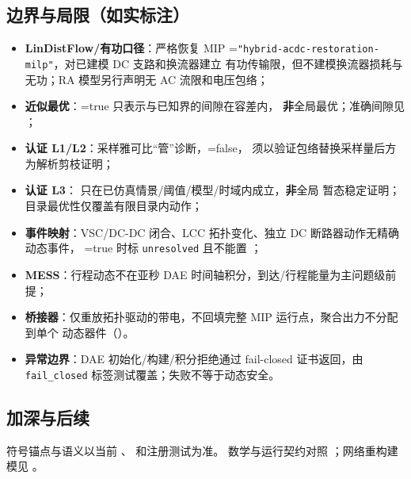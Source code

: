 \subsection{边界与局限（如实标注）}
\begin{itemize}
  \item \textbf{LinDistFlow/有功口径}：严格恢复 MIP
        =\texttt{"hybrid-acdc-restoration-milp"}，对已建模 DC 支路和换流器建立
        有功传输限，但不建模换流器损耗与无功；RA 模型另行声明无 AC 流限和电压包络；
  \item \textbf{近似最优}：=true 只表示与已知界的间隙在容差内，
        \textbf{非}全局最优；准确间隙见 ；
  \item \textbf{认证 L1/L2}：采样雅可比“管”诊断，=false，
        须以验证包络替换采样量后方为解析剪枝证明；
  \item \textbf{认证 L3}： 只在已仿真情景/阈值/模型/时域内成立，\textbf{非}全局
        暂态稳定证明；目录最优性仅覆盖有限目录内动作；
  \item \textbf{事件映射}：VSC/DC-DC 闭合、LCC 拓扑变化、独立 DC 断路器动作无精确动态事件，
        =true 时标 \texttt{unresolved} 且不能置 ；
  \item \textbf{MESS}：行程动态不在亚秒 DAE 时间轴积分，到达/行程能量为主问题级前提；
  \item \textbf{桥接器}：仅重放拓扑驱动的带电，不回填完整 MIP 运行点，聚合出力不分配到单个
        动态器件（）。
  \item \textbf{异常边界}：DAE 初始化/构建/积分拒绝通过 fail-closed 证书返回，由
        \texttt{fail\_closed} 标签测试覆盖；失败不等于动态安全。
\end{itemize}

\subsection{加深与后续}
符号锚点与语义以当前 、 和注册测试为准。
数学与运行契约对照
；网络重构建模见
。
